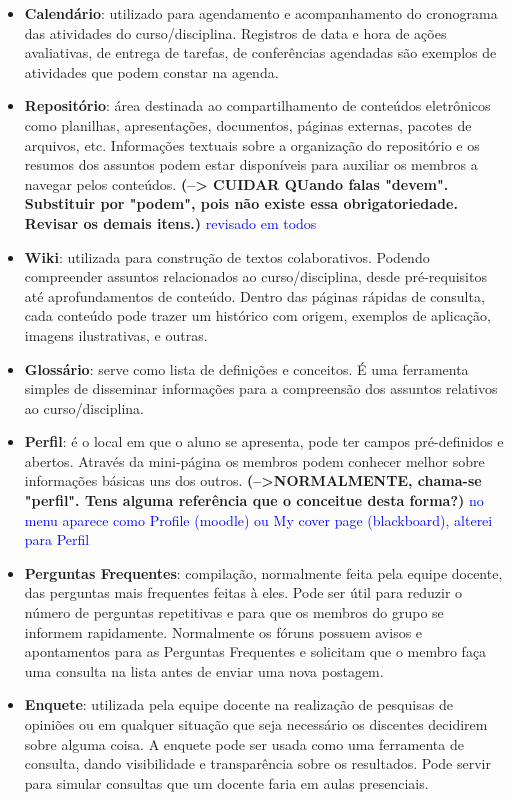 \begin{itemize}
\item \textbf{Calendário}: utilizado para agendamento e acompanhamento do cronograma das atividades do curso/disciplina. Registros de data e hora de ações avaliativas, de entrega de tarefas, de conferências agendadas são exemplos de atividades que podem constar na agenda. 
\item \textbf{Repositório}: área destinada ao compartilhamento de conteúdos eletrônicos como planilhas, apresentações, documentos, páginas externas, pacotes de arquivos, etc. Informações textuais sobre a organização do repositório e os resumos dos assuntos podem estar disponíveis para auxiliar os membros a navegar pelos conteúdos. \textbf{(--> CUIDAR QUando falas "devem". Substituir por "podem", pois não existe essa obrigatoriedade. Revisar os demais itens.)} \textcolor{blue} {revisado em todos}
\item \textbf{Wiki}: utilizada para construção de textos colaborativos. Podendo compreender assuntos relacionados ao curso/disciplina, desde pré-requisitos até aprofundamentos de conteúdo. Dentro das páginas rápidas de consulta, cada conteúdo pode trazer um histórico com origem, exemplos de aplicação, imagens ilustrativas, e outras. 
\item \textbf{Glossário}: serve como lista de definições e conceitos. É uma ferramenta simples de disseminar informações para a compreensão dos assuntos relativos ao curso/disciplina.
\item \textbf{Perfil}: é o local em que o aluno se apresenta, pode ter campos pré-definidos e abertos. Através da mini-página os membros podem conhecer melhor sobre informações básicas uns dos outros. \textbf{(-->NORMALMENTE, chama-se "perfil". Tens alguma referência que o conceitue desta forma?)} \textcolor{blue} {no menu aparece como Profile (moodle) ou My cover page (blackboard), alterei para Perfil}
\item \textbf{Perguntas Frequentes}: compilação, normalmente feita pela equipe docente, das perguntas mais frequentes feitas à eles. Pode ser útil para reduzir o número de perguntas repetitivas e para que os membros do grupo se informem rapidamente. Normalmente os fóruns possuem avisos e apontamentos para as Perguntas Frequentes e solicitam que o membro faça uma consulta na lista antes de enviar uma nova postagem.
\item \textbf{Enquete}: utilizada pela equipe docente na realização de pesquisas de opiniões ou em qualquer situação que seja necessário os discentes decidirem sobre alguma coisa. A enquete pode ser usada como uma ferramenta de consulta, dando visibilidade e transparência sobre os resultados. Pode servir para simular consultas que um docente faria em aulas presenciais.

\end{itemize}
